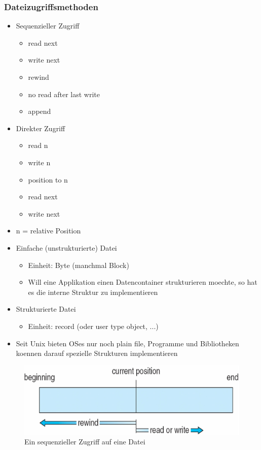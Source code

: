 \documentclass[a4paper]{scrreprt}
\begin{document}
\subsubsection{Dateizugriffsmethoden}
\begin{itemize}
	\item Sequenzieller Zugriff
		\begin{itemize}
			\item read next
			\item write next
			\item rewind
			\item no read after last write
			\item append
		\end{itemize}
	\item Direkter Zugriff
		\begin{itemize}
			\item read n
			\item write n
			\item position to n
			\item read next
			\item write next
		\end{itemize}
	\item n = relative Position
	\item Einfache (unstrukturierte) Datei
		\begin{itemize}
			\item Einheit: Byte (manchmal Block)
			\item Will eine Applikation einen Datencontainer strukturieren moechte, so hat es die interne Struktur zu implementieren
		\end{itemize}
	\item Strukturierte Datei
		\begin{itemize}
			\item Einheit: record (oder user type object, ...)
		\end{itemize}
	\item Seit Unix bieten OSes nur noch plain file, Programme und Bibliotheken koennen darauf spezielle Strukturen implementieren
\end{itemize}

\begin{figure}[ht]
\centering
\includegraphics[scale=0.15]{graphics/sequential_access.png}
\caption{Ein sequenzieller Zugriff auf eine Datei}
\end{figure}
\end{document}

